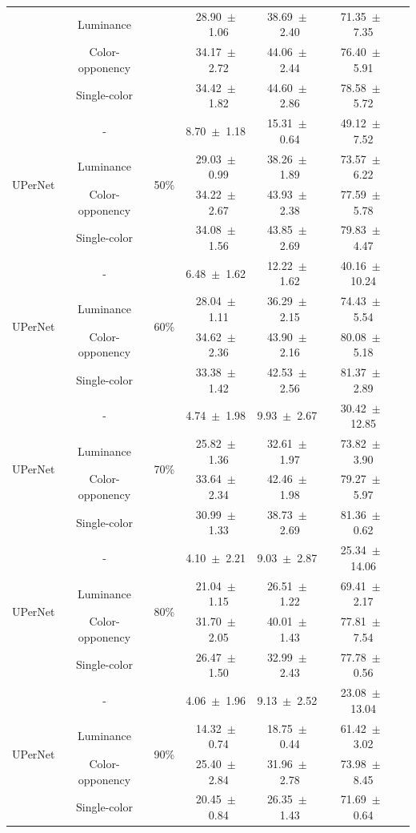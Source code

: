 \begin{table}[h]
\begin{tabular}{@{}lccc ccc@{}}
& Luminance & & 28.90~$\pm$~1.06 & 38.69~$\pm$~2.40 & 71.35~$\pm$~7.35 \\
& Color-opponency & & 34.17~$\pm$~2.72 & 44.06~$\pm$~2.44 & 76.40~$\pm$~5.91 \\
& Single-color & & 34.42~$\pm$~1.82 & 44.60~$\pm$~2.86 & 78.58~$\pm$~5.72 \\
\midrule
\multirow{4}{*}{UPerNet} & - & \multirow{4}{*}{50\%} & 8.70~$\pm$~1.18 & 15.31~$\pm$~0.64 & 49.12~$\pm$~7.52 \\
& Luminance & & 29.03~$\pm$~0.99 & 38.26~$\pm$~1.89 & 73.57~$\pm$~6.22 \\
& Color-opponency & & 34.22~$\pm$~2.67 & 43.93~$\pm$~2.38 & 77.59~$\pm$~5.78 \\
& Single-color & & 34.08~$\pm$~1.56 & 43.85~$\pm$~2.69 & 79.83~$\pm$~4.47 \\
\midrule
\multirow{4}{*}{UPerNet} & - & \multirow{4}{*}{60\%} & 6.48~$\pm$~1.62 & 12.22~$\pm$~1.62 & 40.16~$\pm$~10.24 \\
& Luminance & & 28.04~$\pm$~1.11 & 36.29~$\pm$~2.15 & 74.43~$\pm$~5.54 \\
& Color-opponency & & 34.62~$\pm$~2.36 & 43.90~$\pm$~2.16 & 80.08~$\pm$~5.18 \\
& Single-color & & 33.38~$\pm$~1.42 & 42.53~$\pm$~2.56 & 81.37~$\pm$~2.89 \\
\midrule
\multirow{4}{*}{UPerNet} & - & \multirow{4}{*}{70\%} & 4.74~$\pm$~1.98 & 9.93~$\pm$~2.67 & 30.42~$\pm$~12.85 \\
& Luminance & & 25.82~$\pm$~1.36 & 32.61~$\pm$~1.97 & 73.82~$\pm$~3.90 \\
& Color-opponency & & 33.64~$\pm$~2.34 & 42.46~$\pm$~1.98 & 79.27~$\pm$~5.97 \\
& Single-color & & 30.99~$\pm$~1.33 & 38.73~$\pm$~2.69 & 81.36~$\pm$~0.62 \\
\midrule
\multirow{4}{*}{UPerNet} & - & \multirow{4}{*}{80\%} & 4.10~$\pm$~2.21 & 9.03~$\pm$~2.87 & 25.34~$\pm$~14.06 \\
& Luminance & & 21.04~$\pm$~1.15 & 26.51~$\pm$~1.22 & 69.41~$\pm$~2.17 \\
& Color-opponency & & 31.70~$\pm$~2.05 & 40.01~$\pm$~1.43 & 77.81~$\pm$~7.54 \\
& Single-color & & 26.47~$\pm$~1.50 & 32.99~$\pm$~2.43 & 77.78~$\pm$~0.56 \\
\midrule
\multirow{4}{*}{UPerNet} & - & \multirow{4}{*}{90\%} & 4.06~$\pm$~1.96 & 9.13~$\pm$~2.52 & 23.08~$\pm$~13.04 \\
& Luminance & & 14.32~$\pm$~0.74 & 18.75~$\pm$~0.44 & 61.42~$\pm$~3.02 \\
& Color-opponency & & 25.40~$\pm$~2.84 & 31.96~$\pm$~2.78 & 73.98~$\pm$~8.45 \\
& Single-color & & 20.45~$\pm$~0.84 & 26.35~$\pm$~1.43 & 71.69~$\pm$~0.64 \\
\midrule
\bottomrule
\end{tabular}
\label{tab:sparse_results_upernet_acdc_rain}
\end{table}